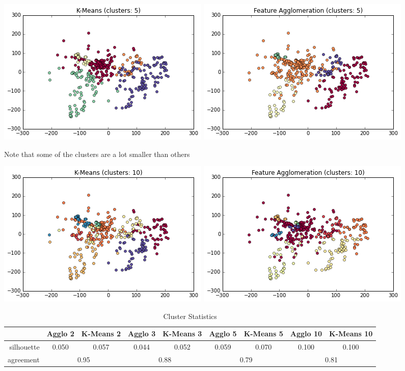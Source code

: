 \documentclass[paper.tex]{subfiles}
\begin{document}
	\includegraphics[width=0.5\linewidth]{images/clusters_km_5.png}
	\includegraphics[width=0.5\linewidth]{images/clusters_fa_5.png}
	
	Note that some of the clusters are a lot smaller than others

	\includegraphics[width=0.5\linewidth]{images/clusters_km_10.png}
	\includegraphics[width=0.5\linewidth]{images/clusters_fa_10.png}
	
	\begin{table}[!h]
		\caption{Cluster Statistics}
		\def\arraystretch{1.3}%
		\begin{tabular}{r||cc|cc|cc|cc|}
			 & Agglo 2 & K-Means 2 & Agglo 3 & K-Means 3 & Agglo 5 &  K-Means 5 & Agglo 10 & K-Means 10\\\hline
		silhouette & 0.050 & 0.057 & 0.044 & 0.052 & 0.059 & 0.070 & 0.100 & 0.100 \\
	 agreement  & \multicolumn{2}{|c|}{0.95} & \multicolumn{2}{|c|}{0.88} & \multicolumn{2}{|c|}{0.79}& \multicolumn{2}{|c|}{0.81}\\\hline
		\end{tabular}
	\end{table}
		
\end{document}
